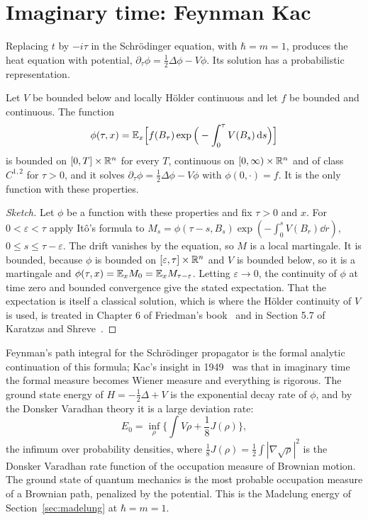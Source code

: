 \section{Imaginary time: Feynman Kac}

Replacing $t$ by $-i\tau$ in the Schr\"odinger equation, with $\hbar = m = 1$, produces the heat equation with potential, $\partial_\tau\phi = \frac12\Delta\phi-V\phi$. Its solution has a probabilistic representation.

\begin{theorem}
\label{thm:feynmankac}
Let $V$ be bounded below and locally H\"older continuous and let $f$ be bounded and continuous. The function
\[
\phi(\tau,x) = \mathbb{E}_x\Big[f(B_\tau)\exp\Big(-\int_0^\tau V(B_s)\,\mathrm{d} s\Big)\Big]
\]
is bounded on $[0,T]\times\mathbb{R}^n$ for every $T$, continuous on $[0,\infty)\times\mathbb{R}^n$ and of class $C^{1,2}$ for $\tau>0$, and it solves $\partial_\tau\phi = \frac12\Delta\phi-V\phi$ with $\phi(0,\cdot) = f$. It is the only function with these properties.
\end{theorem}

\begin{proof}[Sketch]
Let $\phi$ be a function with these properties and fix $\tau>0$ and $x$. For $0<\varepsilon<\tau$ apply It\^o's formula to $M_s = \phi(\tau-s,B_s)\exp(-\int_0^sV(B_r)\dd r)$, $0\leq s\leq\tau-\varepsilon$. The drift vanishes by the equation, so $M$ is a local martingale. It is bounded, because $\phi$ is bounded on $[\varepsilon,\tau]\times\mathbb{R}^n$ and $V$ is bounded below, so it is a martingale and $\phi(\tau,x) = \mathbb{E}_xM_0 = \mathbb{E}_xM_{\tau-\varepsilon}$. Letting $\varepsilon\to0$, the continuity of $\phi$ at time zero and bounded convergence give the stated expectation. That the expectation is itself a classical solution, which is where the H\"older continuity of $V$ is used, is treated in Chapter 6 of Friedman's book~\cite{friedman1975} and in Section 5.7 of Karatzas and Shreve~\cite{karatzas1991}.
\end{proof}

Feynman's path integral for the Schr\"odinger propagator is the formal analytic continuation of this formula; Kac's insight in 1949~\cite{kac1949} was that in imaginary time the formal measure becomes Wiener measure and everything is rigorous. The ground state energy of $H = -\frac12\Delta+V$ is the exponential decay rate of $\phi$, and by the Donsker Varadhan theory it is a large deviation rate:
\[
E_0 = \inf_{\rho}\Big\{\int V\rho+\frac18J(\rho)\Big\},
\]
the infimum over probability densities, where $\frac18J(\rho) = \frac12\int|\nabla\sqrt\rho|^2$ is the Donsker Varadhan rate function of the occupation measure of Brownian motion. The ground state of quantum mechanics is the most probable occupation measure of a Brownian path, penalized by the potential. This is the Madelung energy of Section~\ref{sec:madelung} at $\hbar = m = 1$.

